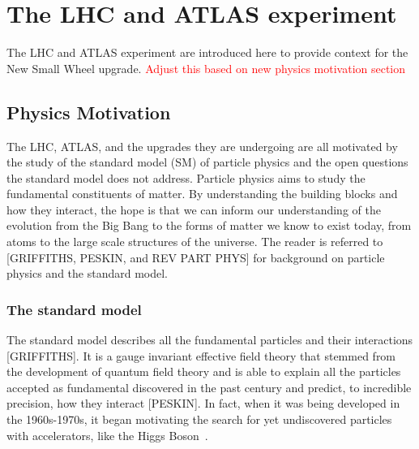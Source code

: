 
\chapter{The LHC and ATLAS experiment}
\label{chap:lhc_atlas}

The LHC and ATLAS experiment are introduced here to provide context for the New Small Wheel upgrade. \textcolor{red}{Adjust this based on new physics motivation section}

\section{Physics Motivation}

The LHC, ATLAS, and the upgrades they are undergoing are all motivated by the study of the standard model (SM) of particle physics and the open questions the standard model does not address. Particle physics aims to study the fundamental constituents of matter. By understanding the building blocks and how they interact, the hope is that we can inform our understanding of the evolution from the Big Bang to the forms of matter we know to exist today, from atoms to the large scale structures of the universe. The reader is referred to [GRIFFITHS, PESKIN, and REV PART PHYS] for background on particle physics and the standard model. 

\subsection{The standard model}

The standard model describes all the fundamental particles and their interactions [GRIFFITHS]. It is a gauge invariant effective field theory that stemmed from the development of quantum field theory and is able to explain all the particles accepted as fundamental discovered in the past century and predict, to incredible precision, how they interact [PESKIN]. In fact, when it was being developed in the 1960s-1970s, it began motivating the search for yet undiscovered particles with accelerators, like the Higgs Boson~\cite{brianti_large_1984}. 

